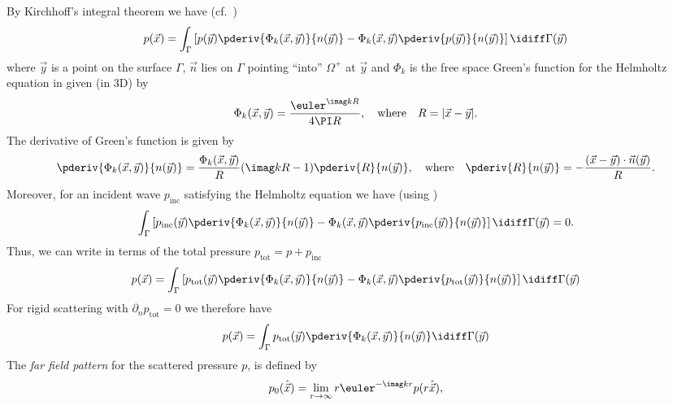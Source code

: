 By Kirchhoff's integral theorem we have (cf.~\cite[Theorem 2.21]{Chandler_Wilde2012nab})
\begin{equation}\label{Eq4:KirchhoffIntegral}
	p(\vec{x}) = \int_{\Gamma}\left[ p(\vec{y})\pderiv{\Phi_k(\vec{x},\vec{y})}{n(\vec{y})} - \Phi_k(\vec{x},\vec{y})\pderiv{p(\vec{y})}{n(\vec{y})}\right]\idiff \Gamma(\vec{y})
\end{equation}
where $\vec{y}$ is a point on the surface $\Gamma$, $\vec{n}$ lies on $\Gamma$ pointing ``into'' $\Omega^+$ at $\vec{y}$ and $\Phi_k$ is the free space Green's function for the Helmholtz equation in  given (in 3D) by
\begin{equation}\label{Eq4:FreeSpaceGrensFunction}
	\Phi_k(\vec{x},\vec{y}) = \frac{\euler^{\imag kR}}{4\PI R},\quad\text{where}\quad R = |\vec{x} - \vec{y}|.
\end{equation}
The derivative of Green's function is given by
\begin{equation*}
	\pderiv{\Phi_k(\vec{x},\vec{y})}{n(\vec{y})} = \frac{\Phi_k(\vec{x},\vec{y})}{R}(\imag kR-1)\pderiv{R}{n(\vec{y})},\quad\text{where}\quad\pderiv{R}{n(\vec{y})} = -\frac{(\vec{x}-\vec{y})\cdot\vec{n}(\vec{y})}{R}.
\end{equation*}
Moreover, for an incident wave $p_{\mathrm{inc}}$ satisfying the Helmholtz equation we have (using \cite[Theorem 2.20]{Chandler_Wilde2012nab})
\begin{equation*}
	\int_{\Gamma}\left[ p_{\mathrm{inc}}(\vec{y})\pderiv{\Phi_k(\vec{x},\vec{y})}{n(\vec{y})} - \Phi_k(\vec{x},\vec{y})\pderiv{p_{\mathrm{inc}}(\vec{y})}{n(\vec{y})}\right]\idiff \Gamma(\vec{y}) = 0.
\end{equation*}
Thus, we can write  in terms of the total pressure $p_{\mathrm{tot}} = p + p_{\mathrm{inc}}$
\begin{equation}
	p(\vec{x}) = \int_{\Gamma}\left[ p_{\mathrm{tot}}(\vec{y})\pderiv{\Phi_k(\vec{x},\vec{y})}{n(\vec{y})} - \Phi_k(\vec{x},\vec{y})\pderiv{p_{\mathrm{tot}}(\vec{y})}{n(\vec{y})}\right]\idiff \Gamma(\vec{y})
\end{equation}
For rigid scattering with $\partial_n p_{\mathrm{tot}} = 0$ we therefore have
\begin{equation}\label{Eq4:farfieldRigid}
	p(\vec{x}) = \int_{\Gamma}p_{\mathrm{tot}}(\vec{y})\pderiv{\Phi_k(\vec{x},\vec{y})}{n(\vec{y})} \idiff \Gamma(\vec{y})
\end{equation}
The \textit{far field pattern} for the scattered pressure $p$, is defined by
\begin{equation}\label{Eq4:farfield}
	p_0(\hat{\vec{x}}) =  \lim_{r\to\infty} r \euler^{-\imag k r}p(r\hat{\vec{x}}),
\end{equation}
